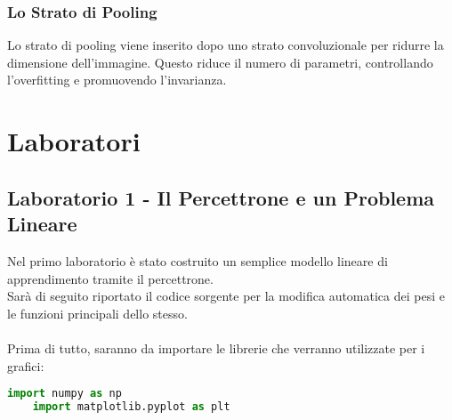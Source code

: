 \documentclass[12pt, a4paper]{article}
\begin{document}
\subsubsection{Lo Strato di Pooling}
Lo strato di pooling viene inserito dopo uno strato convoluzionale per ridurre la dimensione dell'immagine. Questo riduce il numero di parametri, controllando l'overfitting e promuovendo l'invarianza.


\section{Laboratori}
\subsection{Laboratorio 1 - Il Percettrone e un Problema Lineare}
Nel primo laboratorio è stato costruito un semplice modello lineare di apprendimento tramite il percettrone.\\
Sarà di seguito riportato il codice sorgente per la modifica automatica dei pesi e le funzioni principali dello stesso.\\
\\
Prima di tutto, saranno da importare le librerie che verranno utilizzate per i grafici:
\begin{lstlisting}[language=Python, caption=Importazione delle librerie]
    import numpy as np
    import matplotlib.pyplot as plt
\end{lstlisting}
\end{document}
